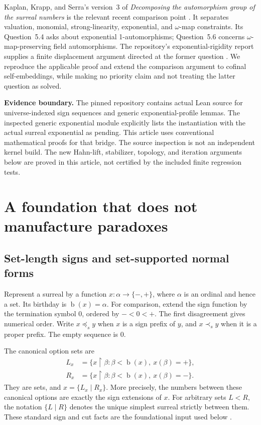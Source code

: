 \documentclass[11pt,a4paper]{article}
\numberwithin{equation}{section}
\theoremstyle{plain}
\theoremstyle{definition}
\theoremstyle{remark}
\newcommand{\bday}{\operatorname{b}}
\newcommand{\pref}{\preccurlyeq_s}
\newcommand{\spref}{\prec_s}
\begin{document}
Kaplan, Krapp, and Serra's version~3 of \emph{Decomposing the automorphism
group of the surreal numbers} is the relevant recent comparison point
\cite{KKS}. It separates valuation, monomial, strong-linearity, exponential,
and $\omega$-map constraints. Its Question~5.4 asks about exponential
1-automorphisms; Question~5.6 concerns $\omega$-map-preserving field
automorphisms. The repository's exponential-rigidity report supplies a
finite displacement argument directed at the former question
\cite{RepoExp}. We reproduce the applicable proof and extend the
comparison argument to cofinal self-embeddings, while making no priority
claim and not treating the latter question as solved.

\begin{overview}
\textbf{Evidence boundary.} The pinned repository contains actual Lean
source for universe-indexed sign sequences and generic exponential-profile
lemmas. The inspected generic exponential module explicitly lists the
instantiation with the actual surreal exponential as pending. This article
uses conventional mathematical proofs for that bridge. The source
inspection is not an independent kernel build. The new Hahn-lift,
stabilizer, topology, and iteration arguments below are proved in this
article, not certified by the included finite regression tests.
\end{overview}

\section{A foundation that does not manufacture paradoxes}\label{sse:sec:foundations}

\subsection{Set-length signs and set-supported normal forms}
Represent a surreal by a function $x:\alpha\to\{-,+\}$, where $\alpha$ is an
ordinal and hence a set. Its birthday is $\bday(x)=\alpha$. For comparison,
extend the sign function by the termination symbol $0$, ordered by
$-<0<+$. The first disagreement gives numerical order. Write
$x\pref y$ when $x$ is a sign prefix of $y$, and $x\spref y$ when it is a
proper prefix. The empty sequence is $0$.

The canonical option sets are
\begin{align}
 L_x&=\{x\restriction\beta:\beta<\bday(x),\ x(\beta)=+\},\\
 R_x&=\{x\restriction\beta:\beta<\bday(x),\ x(\beta)=-\}.
\end{align}
They are sets, and $x=\{L_x\mid R_x\}$. More precisely, the numbers between
these canonical options are exactly the sign extensions of $x$. For
arbitrary sets $L<R$, the notation $\{L\mid R\}$ denotes the unique simplest
surreal strictly between them. These standard sign and cut facts are the
foundational input used below \cite{Conway,Gonshor}.
\end{document}
